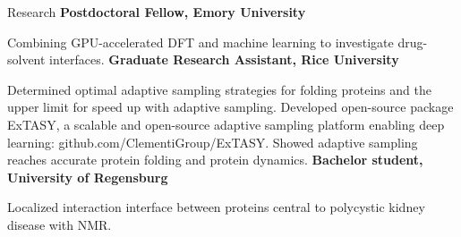 \begin{rubric}{Research}
%
	\textbf{Postdoctoral Fellow, Emory University}
  \par Combining GPU-accelerated DFT and machine learning to investigate drug-solvent interfaces. 
\entry*[2014 -- 2020]%
  \textbf{Graduate Research Assistant, Rice University}
  \par Determined optimal adaptive sampling strategies for folding proteins and the upper limit for speed up with adaptive sampling. Developed open-source package ExTASY, a scalable and open-source adaptive sampling platform enabling deep learning: github.com/ClementiGroup/ExTASY. Showed adaptive sampling reaches accurate protein folding and protein dynamics.
\entry*[2012]%
  \textbf{Bachelor student, University of Regensburg}
  \par Localized interaction interface between proteins central to polycystic kidney disease with NMR.
\end{rubric}
